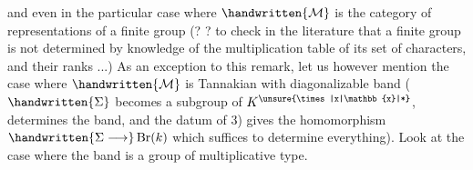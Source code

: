 and even in the particular case where $\handwritten{\mathcal{M}}$ is the category of representations of a finite group (? ? to check in the literature that a finite group is not determined by knowledge of the multiplication table of  its set of characters, and their ranks ...) As an exception to this remark, let us however mention the case where $\handwritten{\mathcal{M}}$ is Tannakian with diagonalizable band ( $\handwritten{\Sigma}$ becomes a subgroup of $K^{\unsure{\times|x|\mathbb{x}|*}}$,  determines the band, and the datum of 3) gives the homomorphism $\handwritten{\Sigma\longrightarrow}\operatorname{Br}(k)$ which suffices to determine everything). Look at the case where the band is a group of multiplicative type.

